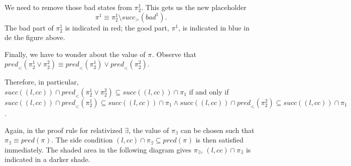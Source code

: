 \documentclass{article}
\newcommand{\placeholder}[1][]{\pi_{#1}}
\newcommand{\loc}{l}
\newcommand{\region}{\mathit{cc}}
\newcommand{\suc}{\mathit{succ}}
\newcommand{\pre}{\mathit{pred}}
\begin{document}
We need to remove those bad states from $\placeholder[2]^1$. This gets us the new placeholder
\begin{equation}
  \placeholder^1 \equiv \placeholder[2]^1 \setminus \suc_{>}(\mathit{bad}^1).
\end{equation}
The bad part of $\placeholder[2]^1$ is indicated in red; the good part, $\placeholder^1$,
is indicated in blue in de the figure above.

Finally, we have to wonder about the value of $\placeholder$. Observe that
$\pre_{<}(\placeholder[2]^1 \lor \placeholder[2]^2) \equiv \pre_{<}(\placeholder[2]^1) \lor \pre_{<}(\placeholder[2]^2)$.

Therefore, in particular, $\suc((\loc, \region)) \cap \pre_{<}(\placeholder[2]^1 \lor \placeholder[2]^2) \subseteq \suc((\loc, \region)) \cap \placeholder[1]$ if and only if
$\suc((\loc, \region)) \cap \pre_{<}(\placeholder[2]^1) \subseteq \suc((\loc, \region)) \cap \placeholder[1] \land \suc((\loc, \region)) \cap \pre_{<}(\placeholder[2]^2) \subseteq \suc((\loc, \region)) \cap \placeholder[1]$.

Again, in the proof rule for relativized $\exists$, the value of $\placeholder[\exists]$
can be chosen such that $\placeholder[\exists] \equiv \pre(\placeholder)$. The
side condition $(\loc, \region) \cap \placeholder[\exists] \subseteq \pre(\placeholder)$
is then satisfied immediately. The shaded area in the following diagram gives
$\placeholder[\exists]$, $(\loc, \region) \cap \placeholder[\exists]$ is indicated
in a darker shade.
\end{document}
